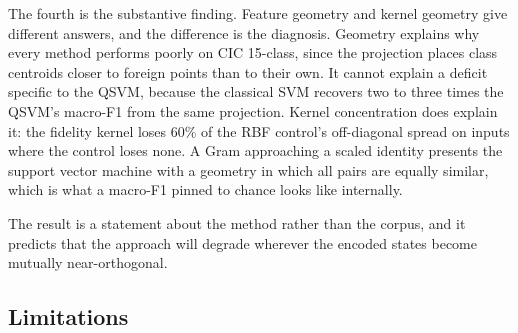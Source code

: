 \documentclass[11pt]{article}
\begin{document}
The fourth is the substantive finding. Feature geometry and kernel geometry give
different answers, and the difference is the diagnosis. Geometry explains why
every method performs poorly on CIC 15-class, since the projection places class
centroids closer to foreign points than to their own. It cannot explain a deficit
specific to the QSVM, because the classical SVM recovers two to three times the
QSVM's macro-F1 from the same projection. Kernel concentration does explain it:
the fidelity kernel loses $60\%$ of the RBF control's off-diagonal spread on
inputs where the control loses none. A Gram approaching a scaled identity
presents the support vector machine with a geometry in which all pairs are
equally similar, which is what a macro-F1 pinned to chance looks like internally.

The result is a statement about the method rather than the corpus, and it
predicts that the approach will degrade wherever the encoded states become
mutually near-orthogonal.

\subsection{Limitations}
\label{sec:limits}
\end{document}
